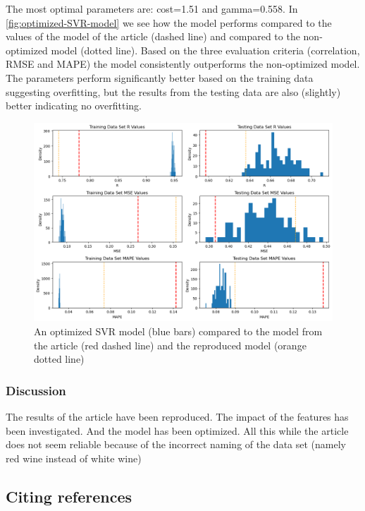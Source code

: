 \documentclass{article}
\begin{document}
The most optimal parameters are: cost=1.51 and gamma=0.558.
In \autoref{fig:optimized-SVR-model} we see how the model performs compared to the values of the model of the article \cite{dahal2021prediction} (dashed line) and compared to the non-optimized model (dotted line). 
Based on the three evaluation criteria (correlation, RMSE and MAPE) the model consistently outperforms the non-optimized model. The parameters perform significantly better based on the training data suggesting overfitting, but the results from the testing data are also (slightly) better indicating no overfitting.
\begin{figure}
	\centering
	\includegraphics[width=\linewidth]{figures/SVR_optimized_model.png}
	\caption{An optimized SVR model (blue bars) compared to the model from the article (red dashed line) and the reproduced model (orange dotted line)}
	\label{fig:optimized-SVR-model}
\end{figure}


\subsubsection{Discussion}

The results of the article have been reproduced. The impact of the features has been investigated. And the model has been optimized. All this while the article does not seem reliable because of the incorrect naming of the data set (namely red wine instead of white wine)


\subsection{Citing references}
\end{document}
